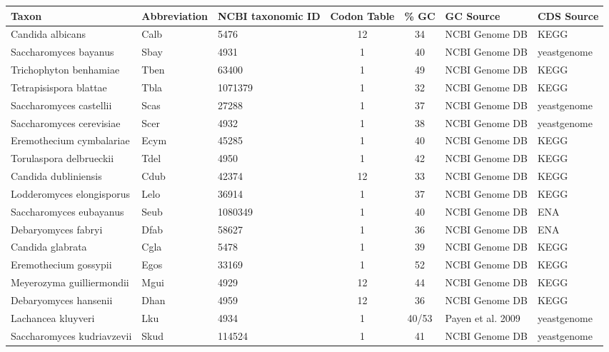 \begin{table}
\begin{tabular}{ | l | l | l | c | c | l | l | }
\hline
	Taxon 				& Abbreviation 	& NCBI taxonomic ID 	& Codon Table	& \% GC & GC Source  		& CDS Source \\ \hline
	Candida albicans 		& Calb 		& 5476 			&	12	& 34 	& NCBI Genome DB 	& KEGG \\ \hline
	Saccharomyces bayanus 		& Sbay 		& 4931 			&	1	& 40 	& NCBI Genome DB 	& yeastgenome \\ \hline
	Trichophyton benhamiae 		& Tben		& 63400 		&	1	& 49 	& NCBI Genome DB 	& KEGG \\ \hline
	Tetrapisispora blattae 		& Tbla 		& 1071379 		&	1	& 32 	& NCBI Genome DB 	& KEGG \\ \hline
	Saccharomyces castellii 	& Scas 		& 27288 		&	1	& 37 	& NCBI Genome DB 	& yeastgenome \\ \hline
	Saccharomyces cerevisiae 	& Scer 		& 4932 			&	1	& 38 	& NCBI Genome DB 	& yeastgenome \\ \hline
	Eremothecium cymbalariae 	& Ecym 		& 45285 		&	1	& 40 	& NCBI Genome DB 	& KEGG \\ \hline
	Torulaspora delbrueckii 	& Tdel 		& 4950 			&	1	& 42 	& NCBI Genome DB 	& KEGG \\ \hline
	Candida dubliniensis 		& Cdub 		& 42374 		&	12	& 33 	& NCBI Genome DB 	& KEGG \\ \hline
	Lodderomyces elongisporus 	& Lelo 		& 36914 		&	1	& 37 	& NCBI Genome DB 	& KEGG \\ \hline
	Saccharomyces eubayanus 	& Seub 		& 1080349 		&	1	& 40 	& NCBI Genome DB 	& ENA \\ \hline
	Debaryomyces fabryi 		& Dfab 		& 58627 		&	1	& 36 	& NCBI Genome DB 	& ENA \\ \hline
	Candida glabrata 		& Cgla 		& 5478 			&	1	& 39 	& NCBI Genome DB 	& KEGG \\ \hline
	Eremothecium gossypii 		& Egos 		& 33169 		&	1	& 52 	& NCBI Genome DB 	& KEGG \\ \hline
	Meyerozyma guilliermondii 	& Mgui 		& 4929 			&	12	& 44 	& NCBI Genome DB 	& KEGG \\ \hline
	Debaryomyces hansenii 		& Dhan 		& 4959 			&	12	& 36 	& NCBI Genome DB 	& KEGG \\ \hline
	Lachancea kluyveri 		& Lku 		& 4934 			&	1	& 40/53 & Payen et al. 2009 	& yeastgenome \\ \hline
	Saccharomyces kudriavzevii 	& Skud 		& 114524 		&	1	& 41 	& NCBI Genome DB 	& yeastgenome \\ \hline

\end{tabular}
\end{table}
